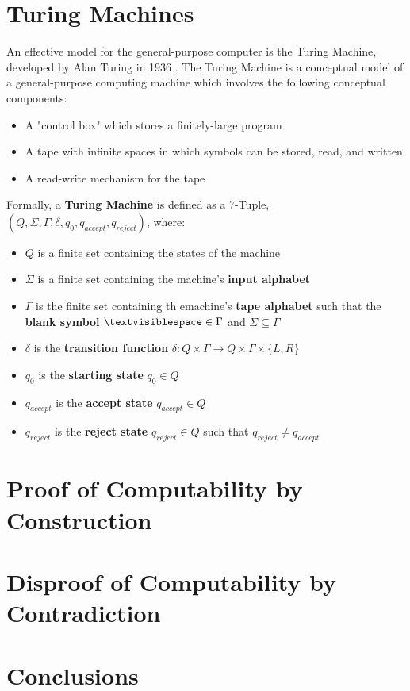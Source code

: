 \documentclass{article}
\begin{document}
\section{Turing Machines}
An effective model for the general-purpose computer is the Turing Machine, developed by Alan Turing in 1936 \cite{2}.  The Turing Machine is a conceptual model of a general-purpose computing machine which involves the following conceptual components:
\begin{itemize}
	\item A "control box" which stores a finitely-large program
	\item A tape with infinite spaces in which symbols can be stored, read, and written
	\item A read-write mechanism for the tape \cite{3}
\end{itemize}
\noindent Formally, a \textbf{Turing Machine} is defined as a 7-Tuple, $(Q, \Sigma, \Gamma, \delta, q_{0}, q_{accept}, q_{reject})$, where:
\begin{itemize}
	\item $Q$ is a finite set containing the states of the machine
	\item $\Sigma$ is a finite set containing the machine's \textbf{input alphabet}
	\item $\Gamma$ is the finite set containing th emachine's \textbf{tape alphabet} such that the \textbf{blank symbol} $\textvisiblespace \in \Gamma$ and $\Sigma \subseteq \Gamma$
	\item $\delta$ is the \textbf{transition function} $\delta: Q \times \Gamma \to Q \times \Gamma \times \{L, R\}$
	\item $q_{0}$ is the \textbf{starting state} $q_{0} \in Q$
	\item $q_{accept}$ is the \textbf{accept state} $q_{accept} \in Q$
	\item $q_{reject}$ is the \textbf{reject state} $q_{reject} \in Q$ such that $q_{reject} \neq q_{accept}$ \cite{2}
\end{itemize}
\section{Proof of Computability by Construction}
\section{Disproof of Computability by Contradiction}
\section{Conclusions}
\end{document}
